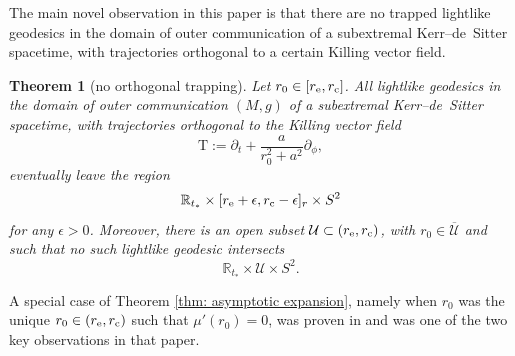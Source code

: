 \documentclass[10pt,a4paper]{amsart}
\newcommand{\e}{\epsilon}
\renewcommand{\d}{\partial}
\newcommand{\U}{\mathcal U}
\newcommand{\T}{\mathrm T}
\newcommand{\R}[0]{\mathbb{R}}
\numberwithin{equation}{section}
\newtheorem{Theorem}{Theorem}[section]
\begin{document}
The main novel observation in this paper is that there are no trapped lightlike geodesics in the domain of outer communication of a subextremal Kerr--de~Sitter spacetime, with trajectories orthogonal to a certain Killing vector field.



\begin{Theorem}[no orthogonal trapping] \label{thm: T-orth trapping}
Let $r_0 \in [r_{\rm e}, r_{\rm c}]$.
All lightlike geodesics in the domain of outer communication $(M,g)$ of a subextremal Kerr--de~Sitter spacetime, with trajectories orthogonal to the Killing vector field
\[
	\T
		:= \d_t + \frac{a}{r_0^2 + a^2} \d_\phi,
\]
eventually leave the region
\[
	\R_{t_*} \times [r_{\rm e}+\e, r_{\rm c}-\e]_r \times S^2
\]
for any $\e > 0$.
Moreover, there is an open subset $\U \subset (r_{\rm e}, r_{\rm c})$, with $r_0 \in \overline{\U}$ and such that no such lightlike geodesic intersects
\begin{equation} \label{eq: timelike region}
	\R_{t_*} \times \U \times S^2.
\end{equation}
\end{Theorem}


\begin{Remark}
A special case of Theorem \ref{thm: asymptotic expansion}, namely when $r_0$ was the unique $r_0 \in (r_{\rm e}, r_{\rm c})$ such that $\mu'(r_0) = 0$,
was proven in \cite[Lemma~2.4]{PV2023} and was one of the two key observations in that paper.
\end{Remark}
\end{document}
